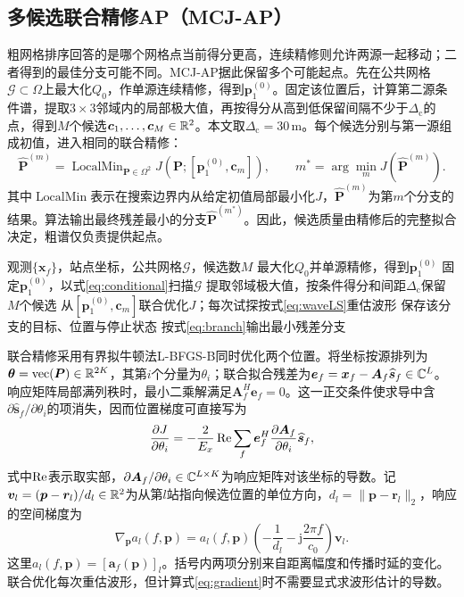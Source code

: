 \subsection{多候选联合精修AP（MCJ-AP）}\label{sec:mcj}
粗网格排序回答的是哪个网格点当前得分更高，连续精修则允许两源一起移动；二者得到的最佳分支可能不同。MCJ-AP据此保留多个可能起点。先在公共网格$\mathcal G\subset\Omega$上最大化$Q_0$，作单源连续精修，得到$\bm p_1^{(0)}$。固定该位置后，计算第二源条件谱，提取$3\times3$邻域内的局部极大值，再按得分从高到低保留间隔不少于$\Delta_{\mathrm c}$的点，得到$M$个候选$\bm c_1,\ldots,\bm c_M\in\mathbb R^2$。本文取$\Delta_{\mathrm c}=30$\,m。每个候选分别与第一源组成初值，进入相同的联合精修：
\begin{equation}
 \widehat{\bm P}^{(m)}=\operatorname{LocalMin}_{\bm P\in\Omega^2}
 J(\bm P;[\bm p_1^{(0)},\bm c_m]),\qquad
 m^*=\arg\min_m J(\widehat{\bm P}^{(m)}).\label{eq:branch}
\end{equation}
其中$\operatorname{LocalMin}$表示在搜索边界内从给定初值局部最小化$J$，$\widehat{\bm P}^{(m)}$为第$m$个分支的结果。算法输出最终残差最小的分支$\widehat{\bm P}^{(m^*)}$。因此，候选质量由精修后的完整拟合决定，粗谱仅负责提供起点。

\begin{algorithm}[H]
\caption{多候选联合精修AP}\label{alg:ap}
\begin{algorithmic}[1]
\Require 观测$\{\bm x_f\}$，站点坐标，公共网格$\mathcal G$，候选数$M$
\State 最大化$Q_0$并单源精修，得到$\bm p_1^{(0)}$
\State 固定$\bm p_1^{(0)}$，以式\eqref{eq:conditional}扫描$\mathcal G$
\State 提取邻域极大值，按条件得分和间距$\Delta_{\mathrm c}$保留$M$个候选
  \State 从$[\bm p_1^{(0)},\bm c_m]$联合优化$J$；每次试探按式\eqref{eq:waveLS}重估波形
  \State 保存该分支的目标、位置与停止状态
\EndFor
\State 按式\eqref{eq:branch}输出最小残差分支
\end{algorithmic}
\end{algorithm}

联合精修采用有界拟牛顿法L-BFGS-B同时优化两个位置\cite{Byrd1995}。将坐标按源排列为$\bm\theta=\operatorname{vec}(\bm P)\in\mathbb R^{2K}$，其第$i$个分量为$\theta_i$；联合拟合残差为$\bm e_f=\bm x_f-\bm A_f\widehat{\bm s}_f\in\mathbb C^L$。响应矩阵局部满列秩时，最小二乘解满足$\bm A_f^H\bm e_f=0$。这一正交条件使求导中含$\partial\widehat{\bm s}_f/\partial\theta_i$的项消失，因而位置梯度可直接写为\cite{GolubPereyra1973}
\begin{equation}
 \frac{\partial J}{\partial\theta_i}
 =-\frac{2}{E_x}\operatorname{Re}\sum_f
 \bm e_f^H\frac{\partial\bm A_f}{\partial\theta_i}
 \widehat{\bm s}_f,\label{eq:gradient}
\end{equation}
式中$\operatorname{Re}$表示取实部，$\partial\bm A_f/\partial\theta_i\in\mathbb C^{L\times K}$为响应矩阵对该坐标的导数。记$\bm v_l=(\bm p-\bm r_l)/d_l\in\mathbb R^2$为从第$l$站指向候选位置的单位方向，$d_l=\|\bm p-\bm r_l\|_2$，响应的空间梯度为
\begin{equation}
 \nabla_{\bm p}a_l(f,\bm p)
 =a_l(f,\bm p)\left(-\frac1{d_l}-\mathrm j\frac{2\pi f}{c_0}\right)\bm v_l.
 \label{eq:responseDerivative}
\end{equation}
这里$a_l(f,\bm p)=[\bm a_f(\bm p)]_l$。括号内两项分别来自距离幅度和传播时延的变化。联合优化每次重估波形，但计算式\eqref{eq:gradient}时不需要显式求波形估计的导数。


